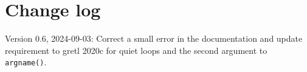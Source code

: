 \documentclass{article}
\begin{document}
\section{Change log}

Version 0.6, 2024-09-03: Correct a small error in the documentation
and update requirement to gretl 2020c for quiet loops and the second
argument to \texttt{argname()}.



\end{document}
